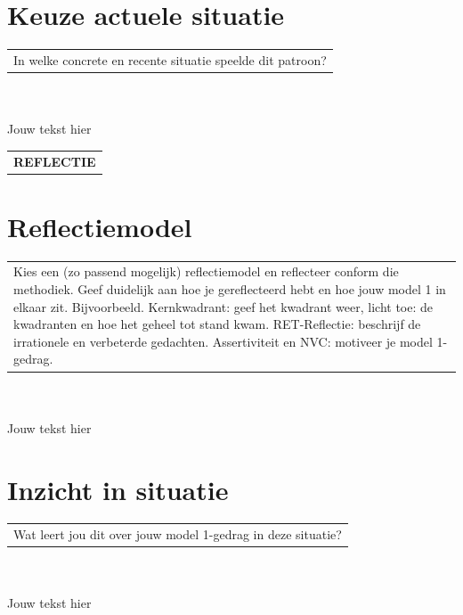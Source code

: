 \documentclass[12pt, a4paper, dutch]{article}
\begin{document}
\section{\small Keuze actuele situatie} \label{section:Keuze_Actuele_Situatie}
\begin{tabular}{p{}}
    \cellcolor{lightgray!30}\tiny In welke concrete en recente situatie speelde dit patroon?
\end{tabular}\\\\
Jouw tekst hier

\pagebreak



















\begin{tabular}{p{}}
    \cellcolor{lightgray!65}\centering \large \vspace{-5pt} \textbf{REFLECTIE}
\end{tabular}

\section{\small Reflectiemodel} \label{section:Reflectiemodel}
\begin{tabular}{p{}}
    \cellcolor{lightgray!30}\tiny Kies een (zo passend mogelijk) reflectiemodel en reflecteer conform die methodiek. Geef duidelijk aan hoe je gereflecteerd hebt en hoe jouw model 1 in elkaar zit. Bijvoorbeeld. Kernkwadrant: geef het kwadrant weer, licht toe: de kwadranten en hoe het geheel tot stand kwam. RET-Reflectie: beschrijf de irrationele en verbeterde gedachten. Assertiviteit en NVC: motiveer je model 1-gedrag.
\end{tabular}\\\\
Jouw tekst hier

\section{\small Inzicht in situatie} \label{section:Inzicht_in_Situatie}
\begin{tabular}{p{}}
    \cellcolor{lightgray!30}\tiny Wat leert jou dit over jouw model 1-gedrag in deze situatie?
\end{tabular}\\\\
Jouw tekst hier
\end{document}
